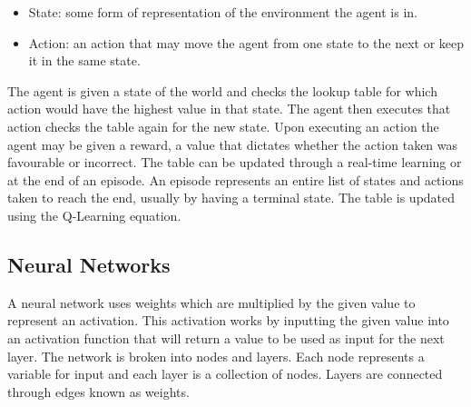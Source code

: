\begin{itemize}
    \item State: some form of representation of the environment the agent is in.
    \item Action: an action that may move the agent from one state to the next or keep it in the same state.
\end{itemize}

The agent is given a state of the world and checks the lookup table for which
action would have the highest value in that state. The agent then executes that
action checks the table again for the new state. Upon executing an action the
agent may be given a reward, a value that dictates whether the action taken was
favourable or incorrect. The table can be updated through a real-time learning
or at the end of an episode. An episode represents an entire list of states and
actions taken to reach the end, usually by having a terminal state. The table is
updated using the Q-Learning equation.


\subsection{Neural Networks}

A neural network uses weights which are multiplied by the given value to
represent an activation. This activation works by inputting the given value into
an activation function that will return a value to be used as input for the next
layer. The network is broken into nodes and layers. Each node represents a
variable for input and each layer is a collection of nodes. Layers are connected
through edges known as weights.

